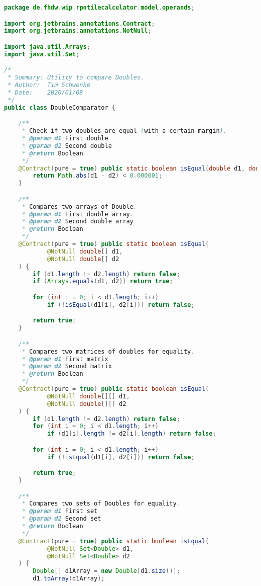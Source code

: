 \begin{lstlisting}[caption=DoubleComparator (Schwenke),label=list:DoubleComparator,language=Java]
package de.fhdw.wip.rpntilecalculator.model.operands;

import org.jetbrains.annotations.Contract;
import org.jetbrains.annotations.NotNull;

import java.util.Arrays;
import java.util.Set;

/*
 * Summary: Utility to compare Doubles.
 * Author:  Tim Schwenke
 * Date:    2020/01/08
 */
public class DoubleComparator {

    /**
     * Check if two doubles are equal (with a certain margin).
     * @param d1 First double
     * @param d2 Second double
     * @return Boolean
     */
    @Contract(pure = true) public static boolean isEqual(double d1, double d2) {
        return Math.abs(d1 - d2) < 0.000001;
    }

    /**
     * Compares two arrays of Double.
     * @param d1 First double array.
     * @param d2 Second double array
     * @return Boolean
     */
    @Contract(pure = true) public static boolean isEqual(
            @NotNull double[] d1,
            @NotNull double[] d2
    ) {
        if (d1.length != d2.length) return false;
        if (Arrays.equals(d1, d2)) return true;

        for (int i = 0; i < d1.length; i++)
            if (!isEqual(d1[i], d2[i])) return false;

        return true;
    }

    /**
     * Compares two matrices of doubles for equality.
     * @param d1 First matrix
     * @param d2 Second matrix
     * @return Boolean
     */
    @Contract(pure = true) public static boolean isEqual(
            @NotNull double[][] d1,
            @NotNull double[][] d2
    ) {
        if (d1.length != d2.length) return false;
        for (int i = 0; i < d1.length; i++)
            if (d1[i].length != d2[i].length) return false;

        for (int i = 0; i < d1.length; i++)
            if (!isEqual(d1[i], d2[i])) return false;

        return true;
    }

    /**
     * Compares two sets of Doubles for equality.
     * @param d1 First set
     * @param d2 Second set
     * @return Boolean
     */
    @Contract(pure = true) public static boolean isEqual(
            @NotNull Set<Double> d1,
            @NotNull Set<Double> d2
    ) {
        Double[] d1Array = new Double[d1.size()];
        d1.toArray(d1Array);


\end{lstlisting}
